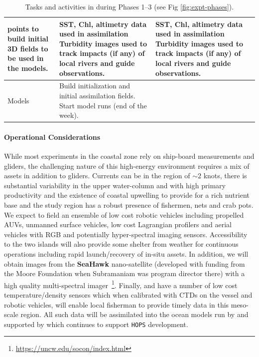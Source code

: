 \begin{table}[!t]
{\begin{tabular}{|p{4cm}|p{4cm}|p{4cm}|p{4cm}|}
                    points to build initial 3D fields to be used in the
                    models.&SST, Chl, altimetry data used in assimilation
                             Turbidity images used to track impacts (if
                             any) of local rivers and guide
                             observations.&SST, Chl, altimetry data used in assimilation
                                            Turbidity images used to
                                            track impacts (if any) of
                                            local rivers and guide
                                            observations.\\
    \hline
    Models&Build initialization and initial assimilation fields. 
            Start model runs (end of the week).&&\\
    \hline
  \end{tabular}
  \label{tab:tasks}
  \caption{Tasks and activities in \proj during Phases 1--3 (see Fig \ref{fig:expt-phases}).}
  }
\end{table}

\paragraph{Operational Considerations} While most experiments in the
coastal zone rely on ship-board measurements and gliders, the
challenging nature of this high-energy environment requires a mix of
assets in addition to gliders. Currents can be in the region of
$\sim 2$ knots, there is substantial variability in the upper
water-column and with high primary productivity and the existence of
coastal upwelling to provide for a rich nutrient base and the study
region has a robust presence of fishermen, nets and crab pots. We
expect to field an ensemble of low cost robotic vehicles including
propelled AUVs, unmanned surface vehicles, low cost Lagrangian
profilers and aerial vehicles with RGB and potentially hyper-spectral
imaging sensors. Accessibility to the two islands will also provide
some shelter from weather for continuous operations including rapid
launch/recovery of in-situ assets. In addition, we will obtain images
from the \textbf{SeaHawk} nano-satellite (developed with funding from
the Moore Foundation when Subramaniam was program director there) with
a high quality multi-spectral
imager~\footnote{\url{https://uncw.edu/socon/index.html}}. Finally,
\univ and \inst have a number of low cost temperature/density sensors
which when calibrated with CTDs on the vessel and robotic vehicles,
will enable local fisherman to provide timely data in this meso-scale
region. All such data will be assimilated into the ocean models run by
\inst and supported by \mit which continues to support \texttt{HOPS}
development.

